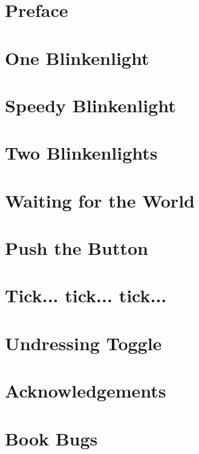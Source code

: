 \documentclass[a5paper,oneside]{scrbook}
\begin{document}
	


\tableofcontents

\chapter*{Preface\label{preface}}


\chapter{One Blinkenlight\label{ch1}}


\chapter{Speedy Blinkenlight\label{ch2}}


\chapter{Two Blinkenlights\label{ch3}}


\chapter*{Waiting for the World\label{medio1}}


\chapter{Push the Button\label{ch4}}


\chapter{Tick... tick... tick...\label{ch5a}}



\chapter{Undressing Toggle\label{ch5}}


\chapter{Acknowledgements\label{acknowledgements}}


\chapter{Book Bugs\label{bugs}}

\end{document}
